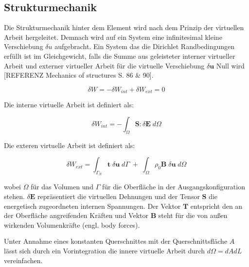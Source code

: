 \documentclass[german,a4paper,12pt,oneside]{scrbook}
\theoremstyle{definition}
\theoremstyle{definition}
\theoremstyle{definition}
\theoremstyle{definition}
\theoremstyle{definition}
\theoremstyle{definition}
\begin{document}
\subsection{Strukturmechanik}
Die Strukturmechanik hinter dem Element wird nach dem Prinzip der virtuellen Arbeit hergeleitet. Demnach wird auf ein System eine infinitesimal kleine Verschiebung $\delta u$ aufgebracht. Ein System das die Dirichlet Randbedingungen erfüllt ist im Gleichgewicht, falls die Summe aus geleisteter  interner virtueller Arbeit und  externer virtueller Arbeit für die virtuelle Verschiebung $\delta \bm{u}$ Null wird [REFERENZ Mechanics of structures S. 86 \& 90]. 

\begin{equation} \label{virtuelle Arbeit}    
    \delta W = - \delta W_{int} + \delta W_{ext} = 0    
\end{equation}      

\vspace{0.5cm}
Die interne virtuelle Arbeit ist definiert als:

\begin{equation} \label{ interne Arbeit}
    \delta W_{int} = - \int_{\Omega}^{} \bm{S} : \delta \bm{E} \; d \Omega
\end{equation}

\vspace{0.5cm}
Die exteren virtuelle Arbeit ist definiert als:

\begin{equation} \label{externe Arbeit}
    \delta W_{ext} = \int_ {\Gamma_N}{} \bm{t} \; \delta \bm{u} \; d \Gamma \; 
    + \; \int_{\Omega}{} \rho_0 \bm{B} \; \delta \bm{u} \; d \Omega
\end{equation}


\vspace{0.5cm}
wobei $\Omega$ für das Volumen und $\Gamma$ für die Oberfläche in der Ausgangskonfiguration stehen. $\delta \bm{E}$ repräsentiert die virtuellen Dehnungen und der Tensor $\bm{S}$ die energetisch zugeordneten internen Spannungen. Der Vektor $\bm{T}$ entspricht den an der Oberfläche angreifenden Kräften und Vektor $\bm{B}$ steht für die von außen wirkenden Volumenkräfte (engl. body forces). 

\vspace{0.5cm}
Unter Annahme eines konstanten Querschnittes mit der Querschnittsfläche $A$ lässt sich durch ein Vorintegration die innere virtuelle Arbeit durch $d \Omega = dA dL$ vereinfachen. 
\end{document}
